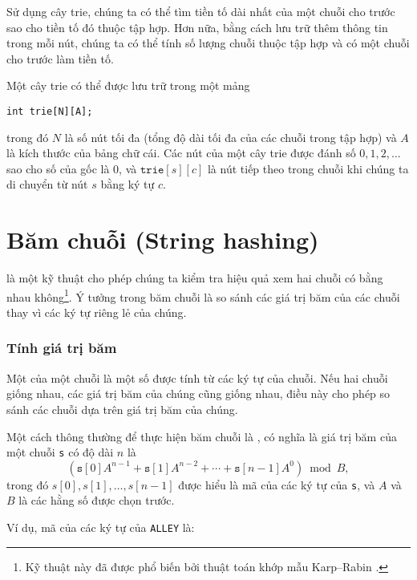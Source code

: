 Sử dụng cây trie, chúng ta có thể tìm
tiền tố dài nhất của một chuỗi cho trước
sao cho tiền tố đó thuộc tập hợp.
Hơn nữa, bằng cách lưu trữ thêm thông tin
trong mỗi nút,
chúng ta có thể tính số lượng
chuỗi thuộc tập hợp và có một
chuỗi cho trước làm tiền tố.

Một cây trie có thể được lưu trữ trong một mảng
\begin{lstlisting}
int trie[N][A];
\end{lstlisting}
trong đó $N$ là số nút tối đa
(tổng độ dài tối đa của các chuỗi trong tập hợp)
và $A$ là kích thước của bảng chữ cái.
Các nút của một cây trie được đánh số
$0,1,2,\ldots$ sao cho số của gốc là 0,
và $\texttt{trie}[s][c]$ là nút tiếp theo trong chuỗi
khi chúng ta di chuyển từ nút $s$ bằng ký tự $c$.

\section{Băm chuỗi (String hashing)}


 là một kỹ thuật
cho phép chúng ta kiểm tra hiệu quả xem hai
chuỗi có bằng nhau không\footnote{Kỹ thuật
này đã được phổ biến bởi thuật toán khớp mẫu Karp–Rabin \cite{kar87}.}.
Ý tưởng trong băm chuỗi là so sánh các giá trị băm của
các chuỗi thay vì các ký tự riêng lẻ của chúng.

\subsubsection*{Tính giá trị băm}


Một  của một chuỗi là
một số được tính từ các ký tự
của chuỗi.
Nếu hai chuỗi giống nhau,
các giá trị băm của chúng cũng giống nhau,
điều này cho phép so sánh các chuỗi
dựa trên giá trị băm của chúng.

Một cách thông thường để thực hiện băm chuỗi
là , có nghĩa là
giá trị băm của một chuỗi \texttt{s}
có độ dài $n$ là
\[(\texttt{s}[0] A^{n-1} + \texttt{s}[1] A^{n-2} + \cdots + \texttt{s}[n-1] A^0) \bmod B  ,\]
trong đó $s[0],s[1],\ldots,s[n-1]$
được hiểu là mã của các ký tự của \texttt{s},
và $A$ và $B$ là các hằng số được chọn trước.

Ví dụ, mã của các ký tự
của \texttt{ALLEY} là:
\begin{center}
\end{center}

